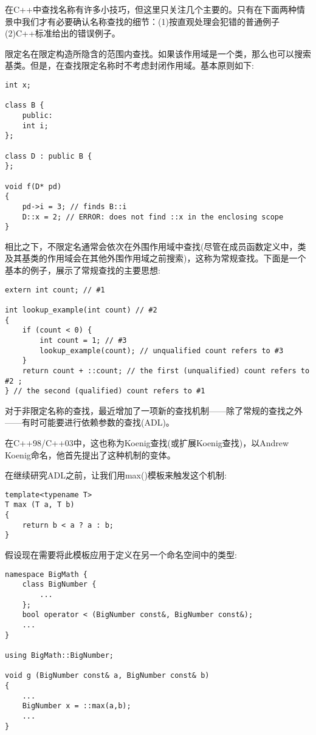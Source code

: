 
在C++中查找名称有许多小技巧，但这里只关注几个主要的。只有在下面两种情景中我们才有必要确认名称查找的细节：(1)按直观处理会犯错的普通例子(2)C++标准给出的错误例子。

限定名在限定构造所隐含的范围内查找。如果该作用域是一个类，那么也可以搜索基类。但是，在查找限定名称时不考虑封闭作用域。基本原则如下:

\begin{lstlisting}[style=styleCXX]
int x;

class B {
	public:
	int i;
};

class D : public B {
};

void f(D* pd)
{
	pd->i = 3; // finds B::i
	D::x = 2; // ERROR: does not find ::x in the enclosing scope
}
\end{lstlisting}

相比之下，不限定名通常会依次在外围作用域中查找(尽管在成员函数定义中，类及其基类的作用域会在其他外围作用域之前搜索)，这称为常规查找。下面是一个基本的例子，展示了常规查找的主要思想:

\begin{lstlisting}[style=styleCXX]
extern int count; // #1

int lookup_example(int count) // #2
{
	if (count < 0) {
		int count = 1; // #3
		lookup_example(count); // unqualified count refers to #3
	}
	return count + ::count; // the first (unqualified) count refers to #2 ;
} // the second (qualified) count refers to #1
\end{lstlisting}

对于非限定名称的查找，最近增加了一项新的查找机制——除了常规的查找之外——有时可能要进行依赖参数的查找(ADL)。

\begin{tcolorbox}[colback=webgreen!5!white,colframe=webgreen!75!black]
\hspace*{0.75cm}在C++98/C++03中，这也称为Koenig查找(或扩展Koenig查找)，以Andrew Koenig命名，他首先提出了这种机制的变体。
\end{tcolorbox}

在继续研究ADL之前，让我们用max()模板来触发这个机制:

\begin{lstlisting}[style=styleCXX]
template<typename T>
T max (T a, T b)
{
	return b < a ? a : b;
}
\end{lstlisting}

假设现在需要将此模板应用于定义在另一个命名空间中的类型:

\begin{lstlisting}[style=styleCXX]
namespace BigMath {
	class BigNumber {
		...
	};
	bool operator < (BigNumber const&, BigNumber const&);
	...
}

using BigMath::BigNumber;

void g (BigNumber const& a, BigNumber const& b)
{
	...
	BigNumber x = ::max(a,b);
	...
}
\end{lstlisting}

